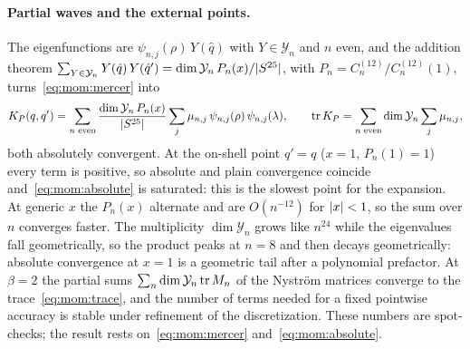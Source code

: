 \paragraph{Partial waves and the external points.}
The eigenfunctions are $\psi_{n, j}(\rho) \, Y(\hat q)$ with $Y \in \mathcal Y_n$ and $n$ even, and the addition theorem $\sum_{Y \in \mathcal Y_n} Y(\hat q) \, Y(\hat q') = \dim \mathcal Y_n \, P_n(x) / {|S^{25}|}$, with $P_n = C^{(12)}_n / C^{(12)}_n(1)$, turns~\eqref{eq:mom:mercer} into
\begin{equation}
  \label{eq:mom:partial-wave-expansion}
  K_P(q, q')
    = \sum_{n \text{ even}} \frac{\dim \mathcal Y_n \, P_n(x)}{{|S^{25}|}} \sum_j \mu_{n, j} \, \psi_{n, j}(\rho) \, \psi_{n, j}(\lambda),
  \qquad
  \operatorname{tr} K_P
    = \sum_{n \text{ even}} \dim \mathcal Y_n \sum_j \mu_{n, j},
\end{equation}
both absolutely convergent.
At the on-shell point $q' = q$ ($x = 1$, $P_n(1) = 1$) every term is positive, so absolute and plain convergence coincide and~\eqref{eq:mom:absolute} is saturated: this is the slowest point for the expansion.
At generic $x$ the $P_n(x)$ alternate and are $O(n^{-12})$ for ${|x|} < 1$, so the sum over $n$ converges faster.
The multiplicity $\dim \mathcal Y_n$ grows like $n^{24}$ while the eigenvalues fall geometrically, so the product peaks at $n = 8$ and then decays geometrically: absolute convergence at $x = 1$ is a geometric tail after a polynomial prefactor.
At $\beta = 2$ the partial sums $\sum_n \dim \mathcal Y_n \operatorname{tr} M_n$ of the Nyström matrices converge to the trace~\eqref{eq:mom:trace}, and the number of terms needed for a fixed pointwise accuracy is stable under refinement of the discretization.
These numbers are spot-checks; the result rests on~\eqref{eq:mom:mercer} and~\eqref{eq:mom:absolute}.

